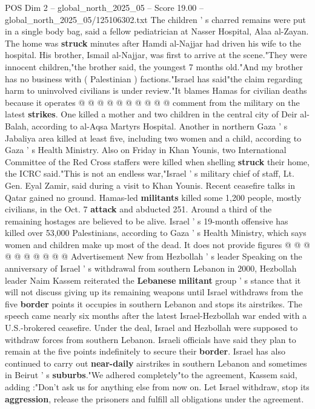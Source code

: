\begin{textsample}{POS Dim 2 – global\_north\_2025\_05 – Score 19.00 – global\_north\_2025\_05/125106302.txt}
The children ' s charred remains were put in a single body bag, said a fellow pediatrician at Nasser Hospital, Alaa al-Zayan.
The home was \textbf{struck} minutes after Hamdi al-Najjar had driven his wife to the hospital.
His brother, Ismail al-Najjar, was first to arrive at the scene."They were innocent children,"the brother said, the youngest 7 months old."And my brother has no business with ( Palestinian ) factions."Israel has said"the claim regarding harm to uninvolved civilians is under review."It blames Hamas for civilian deaths because it operates @ @ @ @ @ @ @ @ @ @ comment from the military on the latest \textbf{strikes}.
One killed a mother and two children in the central city of Deir al-Balah, according to al-Aqsa Martyrs Hospital.
Another in northern Gaza ' s Jabaliya area killed at least five, including two women and a child, according to Gaza ' s Health Ministry.
Also on Friday in Khan Younis, two International Committee of the Red Cross staffers were killed when shelling \textbf{struck} their home, the ICRC said."This is not an endless war,"Israel ' s military chief of staff, Lt.
Gen.
Eyal Zamir, said during a visit to Khan Younis.
Recent ceasefire talks in Qatar gained no ground.
Hamas-led \textbf{militants} killed some 1,200 people, mostly civilians, in the Oct. 7 \textbf{attack} and abducted 251.
Around a third of the remaining hostages are believed to be alive.
Israel ' s 19-month offensive has killed over 53,000 Palestinians, according to Gaza ' s Health Ministry, which says women and children make up most of the dead.
It does not provide figures @ @ @ @ @ @ @ @ @ @ Advertisement New from Hezbollah ' s leader Speaking on the anniversary of Israel ' s withdrawal from southern Lebanon in 2000, Hezbollah leader Naim Kassem reiterated the \textbf{Lebanese} \textbf{militant} group ' s stance that it will not discuss giving up its remaining weapons until Israel withdraws from the five \textbf{border} points it occupies in southern Lebanon and stops its airstrikes.
The speech came nearly six months after the latest Israel-Hezbollah war ended with a U.S.-brokered ceasefire.
Under the deal, Israel and Hezbollah were supposed to withdraw forces from southern Lebanon.
Israeli officials have said they plan to remain at the five points indefinitely to secure their \textbf{border}.
Israel has also continued to carry out \textbf{near-daily} airstrikes in southern Lebanon and sometimes in Beirut ' s \textbf{suburbs}."We adhered completely"to the agreement, Kassem said, adding :"Don't ask us for anything else from now on.
Let Israel withdraw, stop its \textbf{aggression}, release the prisoners and fulfill all obligations under the agreement.

\end{textsample}
